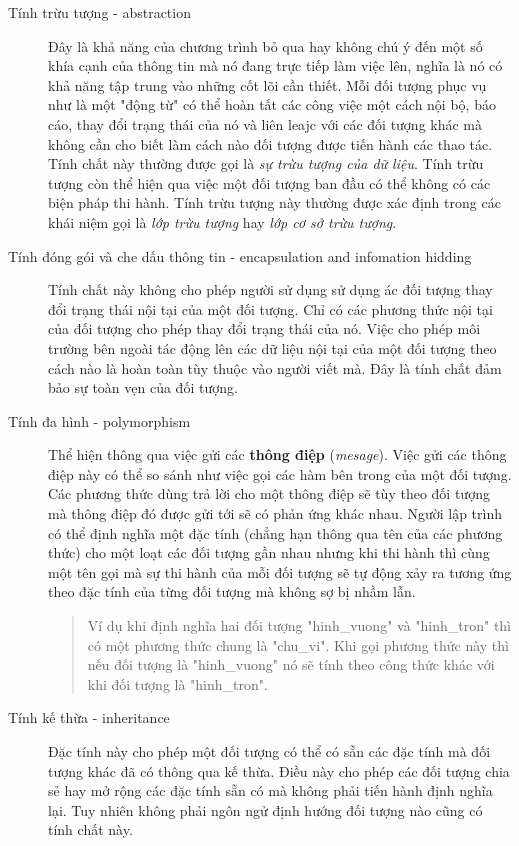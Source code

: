 \documentclass[10pt, a4paper]{article}
\begin{document}
\begin{description}
\item[Tính trừu tượng - abstraction] Đây là khả năng của chương trình bỏ qua hay không chú ý đến một số khía cạnh của thông tin mà nó đang trực tiếp làm việc lên, nghĩa là nó có khả năng tập trung vào những cốt lõi cần thiết.  Mỗi đối tượng phục vụ như là một "động từ" có thể hoàn tất các công việc một cách nội bộ, báo cáo, thay đổi trạng thái của nó và liên leajc với các đối tượng khác mà không cần cho biết làm cách nào đối tượng được tiến hành các thao tác. Tính chất này thường được gọi là \emph{sự trừu tượng của dữ liệu}. Tính trừu tượng còn thể hiện qua việc một đối tượng ban đầu có thể không có các biện pháp thi hành. Tính trừu tượng này thường được xác định trong các khái niệm gọi là \emph{lớp trừu tượng} hay \emph{lớp cơ sở trừu tượng}.
\item[Tính đóng gói và che dấu thông tin - encapsulation and infomation hidding] Tính chất này không cho phép người sử dụng sử dụng ác đối tượng thay đổi trạng thái nội tại của một đối tượng. Chỉ có các phương thức nội tại của đối tượng cho phép thay đổi trạng thái của nó. Việc cho phép môi trường bên ngoài tác động lên các dữ liệu nội tại của một đối tượng theo cách nào là hoàn toàn tùy thuộc vào người viết mà. Đây là tính chất đảm bảo sự toàn vẹn của đối tượng.
\item[Tính đa hình - polymorphism] Thể hiện thông qua việc gửi các {\bf thông điệp} ({\it mesage}). Việc gửi các thông điệp này có thể so sánh như việc gọi các hàm bên trong của một đối tượng. Các phương thức dùng trả lời cho một thông điệp sẽ tùy theo đối tượng mà thông điệp đó được gửi tới sẽ có phản ứng khác nhau. Người lập trình có thể định nghĩa một đặc tính (chẳng hạn thông qua tên của các phương thức) cho một loạt các đối tượng gần nhau nhưng khi thi hành thì cùng một tên gọi mà sự thi hành của mỗi đối tượng sẽ tự động xảy ra tương ứng theo đặc tính của từng đối tượng mà không sợ bị nhầm lẫn.
\begin{quotation}
Ví dụ khi định nghĩa hai đối tượng "hinh\_vuong" và "hinh\_tron" thì có một phương thức chung là "chu\_vi". Khi gọi phương thức này thì nếu đối tượng là "hinh\_vuong" nó sẽ tính theo công thức khác với khi đối tượng là "hinh\_tron".
\end{quotation}
\item[Tính kế thừa - inheritance] Đặc tính này cho phép một đối tượng có thể có sẵn các đặc tính mà đối tượng khác đã có thông qua kế thừa. Điều này cho phép các đối tượng chia sẻ hay mở rộng các đặc tính sẵn có mà không phải tiến hành định nghĩa lại. Tuy nhiên không phải ngôn ngử định hướng đối tượng nào cũng có tính chất này.
\end{description}
\end{document}
